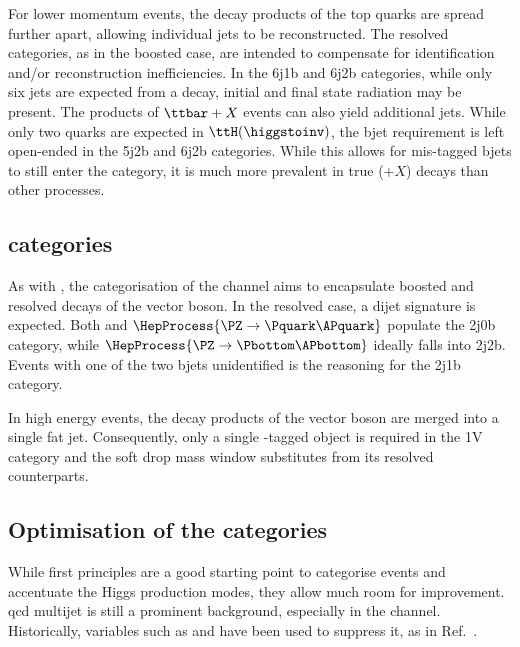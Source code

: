 For lower momentum events, the decay products of the top quarks are spread further apart, allowing individual \glspl{jet} to be reconstructed. The \ttH resolved categories, as in the boosted case, are intended to compensate for identification and/or reconstruction inefficiencies. In the 6j1b and 6j2b categories, while only six \glspl{jet} are expected from a \ttbar decay, initial and final state radiation may be present. The products of $\ttbar + X$ events can also yield additional jets. While only two \Pbottom quarks are expected in $\ttH(\higgstoinv)$, the \gls{bjet} requirement is left open-ended in the 5j2b and 6j2b categories. While this allows for mis-tagged \glspl{bjet} to still enter the category, it is much more prevalent in true \ttbar ($+ X$) decays than other processes.




\subsection{\texorpdfstring{\VH}{VH} categories}
\label{subsec:htoinv_VH_subcats}

As with \ttH, the categorisation of the \VH channel aims to encapsulate boosted and resolved decays of the vector boson. In the resolved case, a dijet signature is expected. Both \PW and $\HepProcess{\PZ \to \Pquark\APquark}$ populate the 2j0b category, while $\HepProcess{\PZ \to \Pbottom\APbottom}$ ideally falls into 2j2b. Events with one of the two \glspl{bjet} unidentified is the reasoning for the 2j1b category.

In high energy events, the decay products of the vector boson are merged into a single fat jet. Consequently, only a single \PVec-tagged object is required in the 1V category and the soft drop mass window substitutes \mjj from its resolved counterparts.




\subsection{Optimisation of the categories}
\label{subsec:htoinv_cat_optimisation}

While first principles are a good starting point to categorise events and accentuate the Higgs production modes, they allow much room for improvement. \acrshort{qcd} multijet is still a prominent background, especially in the \ttH channel. Historically, variables such as \biasedDPhi and \alphat have been used to suppress it, as in Ref.~.


